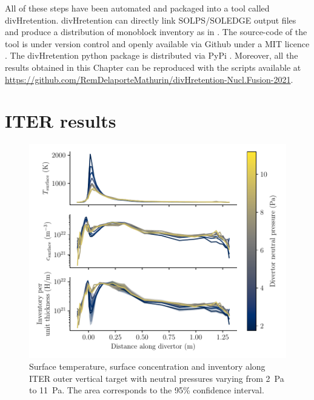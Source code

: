 All of these steps have been automated and packaged into a tool called divHretention.
divHretention can directly link SOLPS/SOLEDGE output files and produce a distribution of monoblock inventory as in .
The source-code of the tool is under version control and openly available via Github under a MIT licence \cite{delaporte-mathurin_irfmdivhretention_2021}.
The divHretention python package is distributed via PyPi \cite{delaporte-mathurin_divhretention_nodate}.
Moreover, all the results obtained in this Chapter can be reproduced with the scripts available at \href{https://github.com/RemDelaporteMathurin/divHretention-Nucl.Fusion-2021}{https://github.com/RemDelaporteMathurin/divHretention-Nucl.Fusion-2021}.

\section{ITER results}

\begin{figure}[h!]
    \centering
    \includegraphics[width=\linewidth]{Figures/Chapter4/ITER/inventory_along_outer_divertor.pdf}
    \caption{Surface temperature, surface concentration and inventory along ITER outer vertical target with neutral pressures varying from \SI{2}{Pa} to \SI{11}{Pa}. The area corresponds to the 95\% confidence interval.}
\end{figure}


